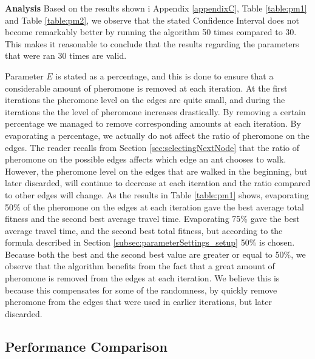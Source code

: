 \textbf{Analysis}
Based on the results shown i Appendix \ref{appendixC}, Table \vref{table:pm1} and Table \vref{table:pm2}, we observe that the stated Confidence Interval does not become remarkably better by running the algorithm 50 times compared to 30. This makes it reasonable to conclude that the results regarding the parameters that were ran 30 times are valid. 


Parameter $E$ is stated as a percentage, and this is done to ensure that a considerable amount of pheromone is removed at each iteration. At the first iterations the pheromone level on the edges are quite small, and during the iterations the the level of pheromone increases drastically. By removing a certain percentage we managed to remove corresponding amounts at each iteration. By evaporating a percentage, we actually do not affect the ratio of pheromone on the edges. The reader recalls from Section \vref{sec:selectingNextNode} that the ratio of pheromone on the possible edges affects which edge an ant chooses to walk. However, the pheromone level on the edges that are walked in the beginning, but later discarded, will continue to decrease at each iteration and the ratio compared to other edges will change. As the results in Table \vref{table:pm1} shows, evaporating 50\% of the pheromone on the edges at each iteration gave the best average total fitness and the second best average travel time. Evaporating 75\% gave the best average travel time, and the second best total fitness, but according to the formula described in Section \vref{subsec:parameterSettings_setup} 50\% is chosen. Because both the best and the second best value are greater or equal to 50\%, we observe that the algorithm benefits from the fact that a great amount of pheromone is removed from the edges at each iteration. We believe this is because this compensates for some of the randomness, by quickly remove pheromone from the edges that were used in earlier iterations, but later discarded. 

\subsection{Performance Comparison}
\label{subsec:performanceComparison_results}


